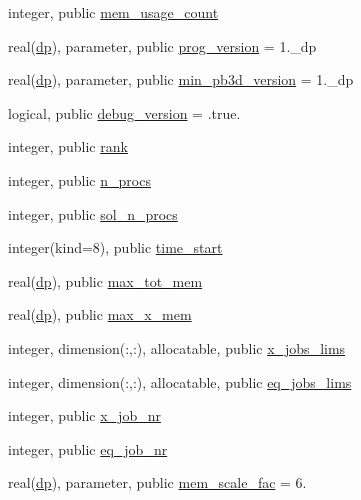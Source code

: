 \begin{DoxyCompactItemize}
integer, public \hyperlink{namespacenum__vars_a7f93ac44620a69373a76d591fa8507a2}{mem\+\_\+usage\+\_\+count}
\item 
real(\hyperlink{namespacenum__vars_a03802aa2bd86439d7a9370836fabf3f2}{dp}), parameter, public \hyperlink{namespacenum__vars_a7ab03bffd054a230cad4b7e2c130def1}{prog\+\_\+version} = 1.\+\_\+dp
\item 
real(\hyperlink{namespacenum__vars_a03802aa2bd86439d7a9370836fabf3f2}{dp}), parameter, public \hyperlink{namespacenum__vars_a7188b02fe090f6e8891fdd26f604284f}{min\+\_\+pb3d\+\_\+version} = 1.\+\_\+dp
\item 
logical, public \hyperlink{namespacenum__vars_a60589d0e73cbffd69d115c1f709745a2}{debug\+\_\+version} = .true.
\item 
integer, public \hyperlink{namespacenum__vars_ab47aa91445feaedb05ac9d1a584664fe}{rank}
\item 
integer, public \hyperlink{namespacenum__vars_a3a1f41c66c3d91fc749bcffd177b0662}{n\+\_\+procs}
\item 
integer, public \hyperlink{namespacenum__vars_a03373a7c9a040867e8108023f2ccf479}{sol\+\_\+n\+\_\+procs}
\item 
integer(kind=8), public \hyperlink{namespacenum__vars_a70922471370a77597325ce9ef7b897a2}{time\+\_\+start}
\item 
real(\hyperlink{namespacenum__vars_a03802aa2bd86439d7a9370836fabf3f2}{dp}), public \hyperlink{namespacenum__vars_ae50396b7028248358850b4524cf84433}{max\+\_\+tot\+\_\+mem}
\item 
real(\hyperlink{namespacenum__vars_a03802aa2bd86439d7a9370836fabf3f2}{dp}), public \hyperlink{namespacenum__vars_af86827817455d27248f5660c3d616283}{max\+\_\+x\+\_\+mem}
\item 
integer, dimension(\+:,\+:), allocatable, public \hyperlink{namespacenum__vars_a476c029a4a53aa1f707d54d18d3c80a0}{x\+\_\+jobs\+\_\+lims}
\item 
integer, dimension(\+:,\+:), allocatable, public \hyperlink{namespacenum__vars_a725aecf3a6f55fee53a5fe3b759d6a25}{eq\+\_\+jobs\+\_\+lims}
\item 
integer, public \hyperlink{namespacenum__vars_a9df427f6582f4528652b3607d1c681b3}{x\+\_\+job\+\_\+nr}
\item 
integer, public \hyperlink{namespacenum__vars_adfff3a032694d6c26e780019772d4cc1}{eq\+\_\+job\+\_\+nr}
\item 
real(\hyperlink{namespacenum__vars_a03802aa2bd86439d7a9370836fabf3f2}{dp}), parameter, public \hyperlink{namespacenum__vars_a37e3db17f8acca3f59bb15381848aa6e}{mem\+\_\+scale\+\_\+fac} = 6.

\end{DoxyCompactItemize}
